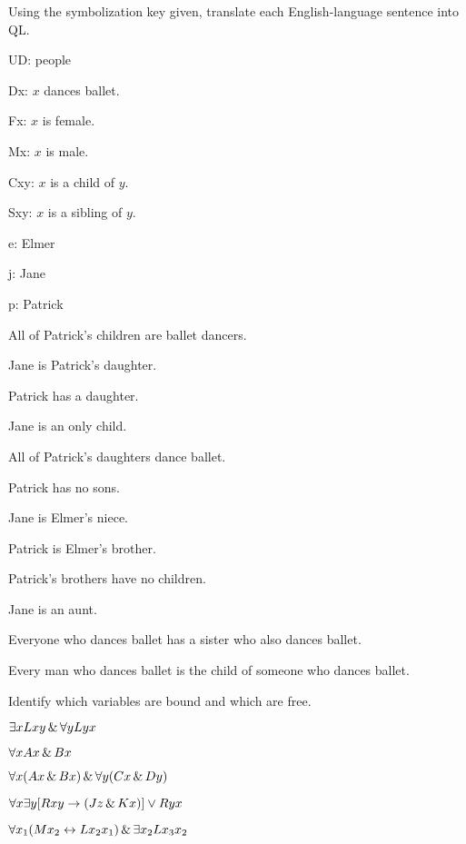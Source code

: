 \solutions
\problempart
\label{pr.QLballet}
Using the symbolization key given, translate each English-language sentence into QL.
\begin{ekey}
\item[UD:] people
\item[Dx:] $x$ dances ballet.
\item[Fx:] $x$ is female.
\item[Mx:] $x$ is male.
\item[Cxy:] $x$ is a child of $y$.
\item[Sxy:] $x$ is a sibling of $y$.
\item[e:] Elmer
\item[j:] Jane
\item[p:] Patrick
\end{ekey}
\begin{earg}
\item All of Patrick's children are ballet dancers.
\item Jane is Patrick's daughter.
\item Patrick has a daughter.
\item Jane is an only child.
\item All of Patrick's daughters dance ballet.
\item Patrick has no sons.
\item Jane is Elmer's niece.
\item Patrick is Elmer's brother.
\item Patrick's brothers have no children.
\item Jane is an aunt.
\item Everyone who dances ballet has a sister who also dances ballet.
\item Every man who dances ballet is the child of someone who dances ballet.
\end{earg}

\problempart
\label{pr.freeQL}
Identify which variables are bound and which are free.
\begin{earg}
\item $\exists x Lxy \,\&\, \forall y Lyx$
\item $\forall x Ax \,\&\, Bx$
\item $\forall x (Ax \,\&\, Bx) \,\&\, \forall y(Cx \,\&\, Dy)$
\item $\forall x\exists y[Rxy \rightarrow (Jz \,\&\, Kx)] \vee Ryx$
\item $\forall x_1(Mx_2 \leftrightarrow Lx_2x_1) \,\&\, \exists x_2 Lx_3x_2$
\end{earg}



